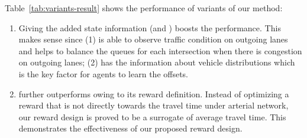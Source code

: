 Table~\ref{tab:variants-result} shows the performance of variants of our method:
\begin{enumerate}[wide,noitemsep,topsep=0pt]
    \item Giving the added state information (\NDeeplight and \SNDeeplight) boosts the performance. This makes sense since (1) \NDeeplight is able to observe traffic condition on outgoing lanes and helps to balance the queues for each intersection when there is congestion on outgoing lanes; (2) \SNDeeplight has the information about vehicle distributions which is the key factor for agents to learn the offsets.
    \item \PressLight further outperforms \SNDeeplight owing to its reward definition. Instead of optimizing a reward that is not directly towards the travel time under arterial network, our reward design is proved to be a surrogate of average travel time. This demonstrates the effectiveness of our proposed reward design.  
\end{enumerate}


